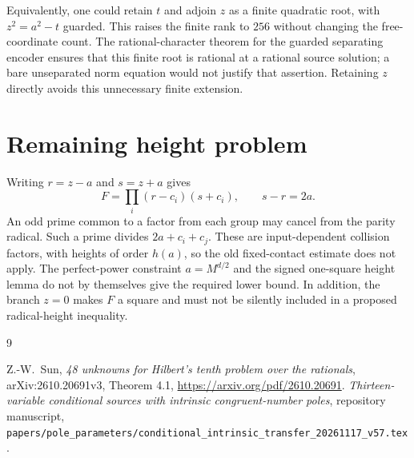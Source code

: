 \documentclass[11pt,a4paper]{article}
\begin{document}
Equivalently, one could retain $t$ and adjoin $z$ as a finite quadratic
root, with $z^2=a^2-t$ guarded. This raises the finite rank to $256$
without changing the free-coordinate count. The rational-character
theorem for the guarded separating encoder ensures that this finite
root is rational at a rational source solution; a bare unseparated
norm equation would not justify that assertion. Retaining $z$
directly avoids this unnecessary finite extension.

\section{Remaining height problem}

Writing $r=z-a$ and $s=z+a$ gives
\[
 F=\prod_i(r-c_i)(s+c_i),\qquad s-r=2a.
\]
An odd prime common to a factor from each group may cancel from
the parity radical. Such a prime divides $2a+c_i+c_j$.
These are input-dependent collision factors, with heights of order
$h(a)$, so the old fixed-contact estimate does not apply. The
perfect-power constraint $a=M^{d/2}$ and the signed one-square
height lemma do not by themselves give the required lower bound.
In addition, the branch $z=0$ makes $F$ a square and must not be
silently included in a proposed radical-height inequality.

\begin{thebibliography}{9}\raggedright
{}Z.-W.~Sun, \emph{48 unknowns for Hilbert's tenth problem
over the rationals}, arXiv:2610.20691v3, Theorem 4.1,
\url{https://arxiv.org/pdf/2610.20691}.
\emph{Thirteen-variable conditional sources with
intrinsic congruent-number poles}, repository manuscript,
\nolinkurl{papers/pole_parameters/conditional_intrinsic_transfer_20261117_v57.tex}.
\end{thebibliography}
\end{document}
